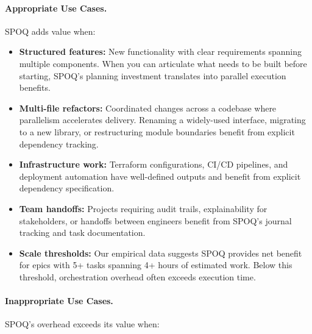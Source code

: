 \paragraph{Appropriate Use Cases.}
SPOQ adds value when:

\begin{itemize}
    \item \textbf{Structured features:} New functionality with clear
    requirements spanning multiple components. When you can articulate
    what needs to be built before starting, SPOQ's planning investment
    translates into parallel execution benefits.

    \item \textbf{Multi-file refactors:} Coordinated changes across a
    codebase where parallelism accelerates delivery. Renaming a widely-used
    interface, migrating to a new library, or restructuring module
    boundaries benefit from explicit dependency tracking.

    \item \textbf{Infrastructure work:} Terraform configurations, CI/CD
    pipelines, and deployment automation have well-defined outputs
    and benefit from explicit dependency specification.

    \item \textbf{Team handoffs:} Projects requiring audit trails,
    explainability for stakeholders, or handoffs between engineers
    benefit from SPOQ's journal tracking and task documentation.

    \item \textbf{Scale thresholds:} Our empirical data suggests SPOQ
    provides net benefit for epics with 5+ tasks spanning 4+ hours
    of estimated work. Below this threshold, orchestration overhead
    often exceeds execution time.
\end{itemize}

\paragraph{Inappropriate Use Cases.}
SPOQ's overhead exceeds its value when:


